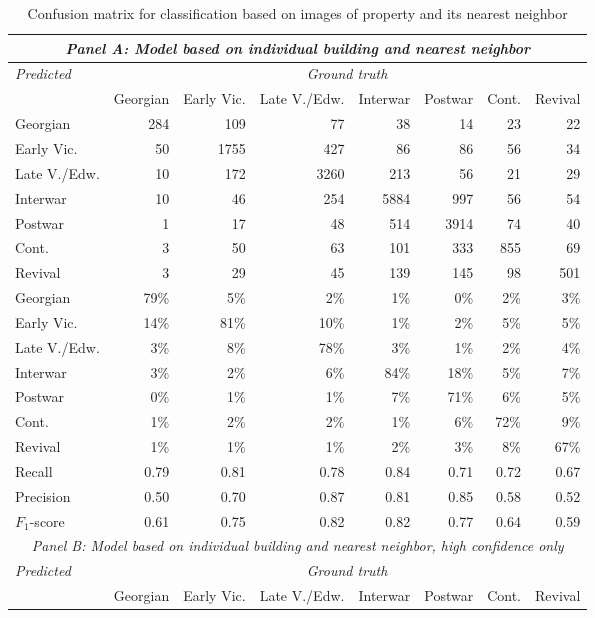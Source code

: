 \begin{table}[!htb]
	\caption{Confusion matrix for classification based on images of property and its nearest neighbor}
	\label{tab:confmat}
	\centering
\begingroup\footnotesize
	\emph{}
\begin{tabular}{lrrrrrrr}
	\multicolumn{8}{c}{\rule{0pt}{4ex}    \emph{Panel A: Model based on individual building and nearest neighbor} \rule{0pt}{4ex}    }\\
	\toprule
	\emph{Predicted} & \multicolumn{7}{c}{\emph{Ground truth}} \\
	\cmidrule(lr){1-1}
	\cmidrule(lr){2-8}
	& Georgian & Early Vic. & Late V./Edw. & Interwar & Postwar & Cont. & Revival \\
  \midrule
	Georgian & 284 & 109 & 77 & 38 & 14 & 23 & 22 \\
	  Early Vic. & 50 & 1755 & 427 & 86 & 86 & 56 & 34 \\
	  Late V./Edw. & 10 & 172 & 3260 & 213 & 56 & 21 & 29 \\
	  Interwar & 10 & 46 & 254 & 5884 & 997 & 56 & 54 \\
	  Postwar & 1 & 17 & 48 & 514 & 3914 & 74 & 40 \\
	  Cont. & 3 & 50 & 63 & 101 & 333 & 855 & 69 \\
	  Revival & 3 & 29 & 45 & 139 & 145 & 98 & 501 \\
		\midrule
	  Georgian & 79\% & 5\% & 2\% & 1\% & 0\% & 2\% & 3\% \\
	  Early Vic. & 14\% & 81\% & 10\% & 1\% & 2\% & 5\% & 5\% \\
	  Late V./Edw. & 3\% & 8\% & 78\% & 3\% & 1\% & 2\% & 4\% \\
	  Interwar & 3\% & 2\% & 6\% & 84\% & 18\% & 5\% & 7\% \\
	  Postwar & 0\% & 1\% & 1\% & 7\% & 71\% & 6\% & 5\% \\
	  Cont. & 1\% & 2\% & 2\% & 1\% & 6\% & 72\% & 9\% \\
	  Revival & 1\% & 1\% & 1\% & 2\% & 3\% & 8\% & 67\% \\
		\midrule
	  Recall & 0.79 & 0.81 & 0.78 & 0.84 & 0.71 & 0.72 & 0.67 \\
	  Precision & 0.50 & 0.70 & 0.87 & 0.81 & 0.85 & 0.58 & 0.52 \\
	  $F_1$-score & 0.61 & 0.75 & 0.82 & 0.82 & 0.77 & 0.64 & 0.59 \\

  \bottomrule
  
 	\multicolumn{8}{c}{\rule{0pt}{4ex}    \emph{ Panel B: Model based on individual building and nearest neighbor, high confidence only} \rule{0pt}{4ex}    }\\
	\toprule
	\emph{Predicted} & \multicolumn{7}{c}{\emph{Ground truth}} \\
	\cmidrule(lr){1-1}
	\cmidrule(lr){2-8}
	& Georgian & Early Vic. & Late V./Edw. & Interwar & Postwar & Cont. & Revival \\
  \midrule


\end{tabular}
\end{table}
